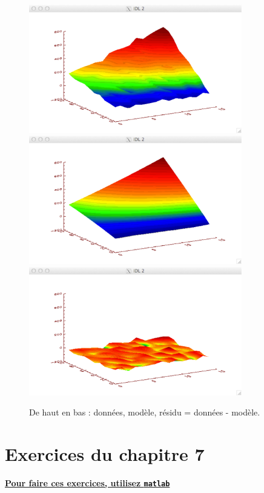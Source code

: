 \documentclass[main.tex]{subfiles}
\begin{document}
\begin{figure}[p]
    \centering
    \includegraphics[width=9.3cm]{assets/figures/exempleData.pdf}\vspace{5mm}
    \includegraphics[width=9.3cm]{assets/figures/exempleModel.pdf}\vspace{5mm}
    \includegraphics[width=9.3cm]{assets/figures/exempleResidu.pdf}
    \caption{De haut en bas : données, modèle, résidu = données - modèle.}
    \label{fig:dmr}
\end{figure}

\newpage

\section{Exercices du chapitre 7}

\begin{center}
    \Large \bf {\underline{Pour faire ces exercices, utilisez \texttt{matlab}}}
\end{center}
\end{document}
